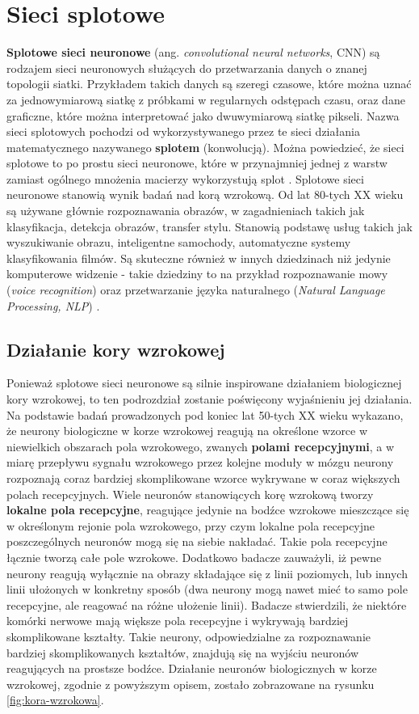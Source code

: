 \documentclass[12pt]{mwbk}
\theoremstyle{plain}
\theoremstyle{definition}
\theoremstyle{remark}
\begin{document}
\section{Sieci splotowe}

\textbf{Splotowe sieci neuronowe} (ang. \emph{convolutional neural networks}, CNN) są rodzajem sieci neuronowych służących do przetwarzania danych o znanej topologii siatki. Przykładem takich danych są szeregi czasowe, które można uznać za jednowymiarową siatkę z próbkami w regularnych odstępach czasu, oraz dane graficzne, które można interpretować jako dwuwymiarową siatkę pikseli. Nazwa sieci splotowych pochodzi od wykorzystywanego przez te sieci działania matematycznego nazywanego \textbf{splotem} (konwolucją). Można powiedzieć, że sieci splotowe to po prostu sieci neuronowe, które w przynajmniej jednej z warstw zamiast ogólnego mnożenia macierzy wykorzystują splot \cite{goodfellow}.
Splotowe sieci neuronowe stanowią wynik badań nad korą wzrokową. Od lat 80-tych XX wieku są używane głównie rozpoznawania obrazów, w zagadnieniach takich jak klasyfikacja, detekcja obrazów, transfer stylu. Stanowią podstawę usług takich jak wyszukiwanie obrazu, inteligentne samochody, automatyczne systemy klasyfikowania filmów. Są skuteczne również w innych dziedzinach niż jedynie komputerowe widzenie - takie dziedziny to na przykład rozpoznawanie mowy (\emph{voice recognition}) oraz przetwarzanie języka naturalnego (\emph{Natural Language Processing, NLP}) \cite{geron}. 

\subsection{Działanie kory wzrokowej}

Ponieważ splotowe sieci neuronowe są silnie inspirowane działaniem biologicznej kory wzrokowej, to ten podrozdział zostanie poświęcony wyjaśnieniu jej działania. Na podstawie badań prowadzonych pod koniec lat 50-tych XX wieku \cite{hubel1} \cite{hubel2} wykazano, że neurony biologiczne w korze wzrokowej reagują na określone wzorce w niewielkich obszarach pola wzrokowego, zwanych \textbf{polami recepcyjnymi}, a w miarę przepływu sygnału wzrokowego przez kolejne moduły w mózgu neurony rozpoznają coraz bardziej skomplikowane wzorce wykrywane w coraz większych polach recepcyjnych.
Wiele neuronów stanowiących korę wzrokową tworzy \textbf{lokalne pola recepcyjne}, reagujące jedynie na bodźce wzrokowe mieszczące się w określonym rejonie pola wzrokowego, przy czym lokalne pola recepcyjne poszczególnych neuronów mogą się na siebie nakładać. Takie pola recepcyjne łącznie tworzą całe pole wzrokowe. Dodatkowo badacze zauważyli, iż pewne neurony reagują wyłącznie na obrazy składające się z linii poziomych, lub innych linii ułożonych w konkretny sposób (dwa neurony mogą nawet mieć to samo pole recepcyjne, ale reagować na różne ułożenie linii). Badacze stwierdzili, że niektóre komórki nerwowe mają większe pola recepcyjne i wykrywają bardziej skomplikowane kształty. Takie neurony, odpowiedzialne za rozpoznawanie bardziej skomplikowanych kształtów, znajdują się na wyjściu neuronów reagujących na prostsze bodźce. Działanie neuronów biologicznych w korze wzrokowej, zgodnie z powyższym opisem, zostało zobrazowane na rysunku \ref{fig:kora-wzrokowa}.
\end{document}
